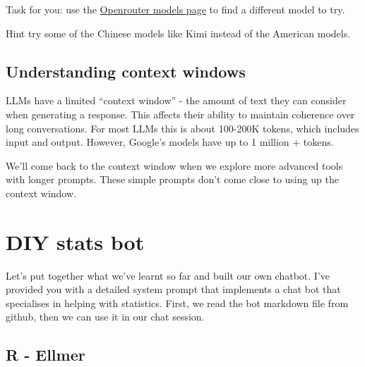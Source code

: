 \documentclass[
  letterpaper,
  DIV=11,
  numbers=noendperiod]{scrreprt}
\newenvironment{Shaded}{\begin{snugshade}}{\end{snugshade}}
\newcommand{\AttributeTok}[1]{\textcolor[rgb]{0.40,0.45,0.13}{#1}}
\newcommand{\DecValTok}[1]{\textcolor[rgb]{0.68,0.00,0.00}{#1}}
\newcommand{\FunctionTok}[1]{\textcolor[rgb]{0.28,0.35,0.67}{#1}}
\newcommand{\NormalTok}[1]{\textcolor[rgb]{0.00,0.23,0.31}{#1}}
\newcommand{\OtherTok}[1]{\textcolor[rgb]{0.00,0.23,0.31}{#1}}
\newcommand{\SpecialCharTok}[1]{\textcolor[rgb]{0.37,0.37,0.37}{#1}}
\newcommand{\StringTok}[1]{\textcolor[rgb]{0.13,0.47,0.30}{#1}}
\begin{document}
Task for you: use the \href{https://openrouter.ai/models}{Openrouter
models page} to find a different model to try.

Hint try some of the Chinese models like Kimi instead of the American
models.

\subsection{Understanding context
windows}\label{understanding-context-windows}

LLMs have a limited ``context window'' - the amount of text they can
consider when generating a response. This affects their ability to
maintain coherence over long conversations. For most LLMs this is about
100-200K tokens, which includes input and output. However, Google's
models have up to 1 million + tokens.

We'll come back to the context window when we explore more advanced
tools with longer prompts. These simple prompts don't come close to
using up the context window.

\section{DIY stats bot}\label{diy-stats-bot}

Let's put together what we've learnt so far and built our own chatbot.
I've provided you with a detailed system prompt that implements a chat
bot that specialises in helping with statistics. First, we read the bot
markdown file from github, then we can use it in our chat session.

\subsection{R - Ellmer}

\begin{Shaded}
\end{Shaded}
\end{document}
